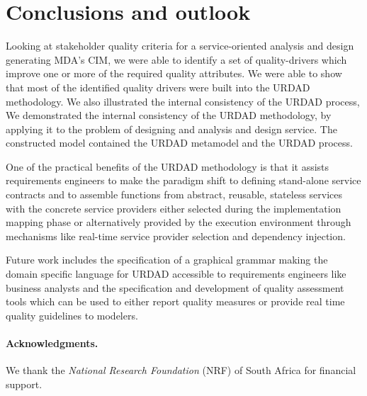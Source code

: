 \section{Conclusions and outlook}

Looking at stakeholder quality criteria for a service-oriented analysis and design generating MDA's CIM, we were able to identify a set of quality-drivers which improve one or more of the required quality attributes. We were able to show that most of the identified quality drivers were built into the URDAD methodology. We also illustrated the internal consistency of the URDAD process, We demonstrated the internal consistency of the URDAD methodology, by applying it to the problem of designing and analysis and design service. The constructed model contained the URDAD metamodel and the URDAD process.

One of the practical benefits of the URDAD methodology is that it assists requirements engineers to make the paradigm shift\cite{haines_impact_2007} to defining stand-alone service contracts and to assemble functions from abstract, reusable, stateless services with the concrete service providers either selected during the implementation mapping phase or alternatively provided by the execution environment through mechanisms like real-time service provider selection and dependency injection.

Future work includes the specification of a graphical grammar making the domain specific language for URDAD accessible to requirements engineers like business analysts and the specification and development of quality assessment tools which can be used to either report quality measures or provide real time quality guidelines to modelers.

\paragraph{Acknowledgments.} We thank the \emph{National Research 
Foundation} (NRF) of South Africa for financial support.
